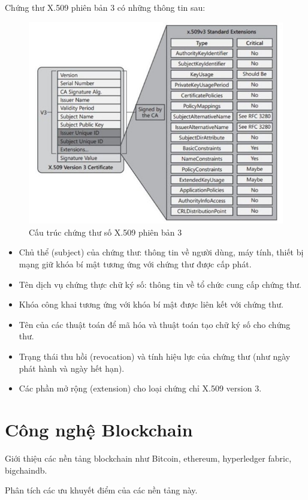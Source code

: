 Chứng thư X.509 phiên bản 3 có những thông tin sau:
\begin{figure}[htbp]
\centering
\includegraphics[width=.9\linewidth]{img/x509v3.jpg}
\caption{Cấu trúc chứng thư số X.509 phiên bản 3}
\end{figure}
\begin{itemize}

\item Chủ thể (subject) của chứng thư: thông tin về người dùng, máy tính, thiết bị mạng giữ khóa bí mật tương ứng với chứng thư được cấp phát.
\item Tên dịch vụ chứng thực chữ ký số: thông tin về tổ chức cung cấp chứng thư.
\item Khóa công khai tương ứng với khóa bí mật được liên kết với chứng thư.
\item Tên của các thuật toán để mã hóa và thuật toán tạo chữ ký số cho chứng thư.
\item Trạng thái thu hồi (revocation) và tính hiệu lực của chứng thư (như ngày phát hành và ngày hết hạn).
\item Các phần mở rộng (extension) cho loại chứng chỉ X.509 version 3.

\end{itemize}

\section{Công nghệ Blockchain}

Giới thiệu các nền tảng blockchain như Bitcoin, ethereum, hyperledger fabric, bigchaindb.

Phân tích các ưu khuyết điểm của các nền tảng này.


